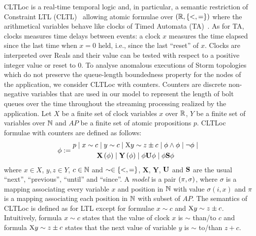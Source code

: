 CLTLoc is a real-time temporal logic and, in particular, a semantic restriction of Constraint LTL (CLTL)~\cite{DD07} allowing atomic formulae over $(\mathbb{R}, \{ <,= \})$ where the arithmetical variables behave like clocks of Timed Automata (TA)~\cite{timed}.
As for TA, clocks measures time delays between events: a clock $x$ measures the time elapsed since the last time when $x=0$ held, i.e., since the last ``reset'' of $x$.
Clocks are interpreted over Reals and their value can be tested with respect to a positive integer value or reset to 0.
%
To analyse anomalous executions of Storm topologies which do not preserve the queue-length boundedness property for the nodes of the application, we consider CLTLoc with counters.
Counters are discrete non-negative variables that are used in our model to represent the length of bolt queues over the time throughout the streaming processing realized by the application.
Let $X$ be a finite set of clock variables $x$ over $\mathbb{R}$, $Y$ be a finite set of variables over $\mathbb{N}$ and $AP$ be a finite set of atomic propositions $p$.
CLTLoc formulae with counters are defined as follows:
\begin{equation*}%
  \phi :=
  \begin{gathered}
    p \mid x\sim c \mid y\sim c\mid \aX y\sim z\pm c \mid\phi \wedge \phi \mid \neg \phi \mid \\
       \X{\phi} \mid \Y{\phi} %
\mid \phi\U\phi \mid \phi\Snc\phi
  \end{gathered}
\end{equation*}
where $x \in X$, $y,z \in Y$, $c \in \mathbb{N}$ and 
$\sim \in \{ <,= \}$, $\mathbf{X}$, $\mathbf{Y}$, $\mathbf{U}$ and $\mathbf{S}$ are the
usual ``next'', ``previous'', ``until'' and ``since''.
A \textit{model} is a pair $(\pi, \sigma)$, where $\sigma$ is a mapping associating every variable $x$ and position in $\mathbb{N}$ with value $\sigma(i,x)$ and $\pi$ is a mapping associating each position in $\mathbb{N}$ with subset of $AP$. 
The semantics of CLTLoc is defined as for LTL except for formulae $x\sim c$ and $\mathrm{X} y \sim z\pm c$. 
Intuitively, formula $x\sim c$ states that the value of clock $x$ is $\sim$ than/to $c$ and formula $\mathrm{X} y \sim z\pm c$ states that the next value of variable $y$ is $\sim$ to/than $z+c$.

